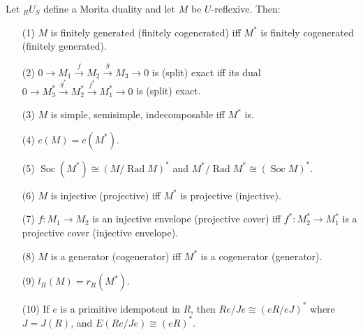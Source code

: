 Let ${}_R U_S$ define a Morita duality and let $M$ be $U$-reflexive. Then:

\begin{enumerate}
\item[(1)] $M$ is finitely generated (finitely cogenerated) iff $M^*$ is finitely cogenerated (finitely generated).
\item[(2)] $0 \to M_1 \xrightarrow{f} M_2 \xrightarrow{g} M_3 \to 0$ is (split) exact iff its dual $0 \to M_3^* \xrightarrow{g^*} M_2^* \xrightarrow{f^*} M_1^* \to 0$ is (split) exact.
\item[(3)] $M$ is simple, semisimple, indecomposable iff $M^*$ is.
\item[(4)] $c(M) = c(M^*)$.
\item[(5)] $\operatorname{Soc}(M^*) \cong (M/\operatorname{Rad} M)^*$ and $M^*/\operatorname{Rad} M^* \cong (\operatorname{Soc} M)^*$.
\item[(6)] $M$ is injective (projective) iff $M^*$ is projective (injective).
\item[(7)] $f: M_1 \to M_2$ is an injective envelope (projective cover) iff $f^*: M_2^* \to M_1^*$ is a projective cover (injective envelope).
\item[(8)] $M$ is a generator (cogenerator) iff $M^*$ is a cogenerator (generator).
\item[(9)] $l_R(M) = r_R(M^*)$.
\item[(10)] If $e$ is a primitive idempotent in $R$, then $Re/Je \cong (eR/eJ)^*$ where $J = J(R)$, and $E(Re/Je) \cong (eR)^*$.
\end{enumerate}
